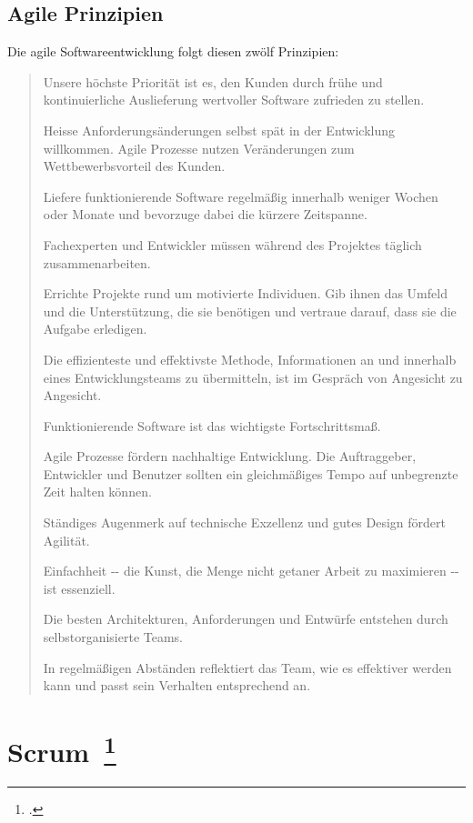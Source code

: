 \subsection{Agile Prinzipien}

Die agile Softwareentwicklung folgt diesen zwölf Prinzipien:

\begin{quote}Unsere höchste Priorität ist es, den Kunden durch frühe und kontinuierliche Auslieferung wertvoller Software zufrieden zu stellen.

Heisse Anforderungsänderungen selbst spät in der Entwicklung willkommen. Agile Prozesse nutzen Veränderungen zum Wettbewerbsvorteil des Kunden.

Liefere funktionierende Software regelmäßig innerhalb weniger Wochen oder Monate und bevorzuge dabei die kürzere Zeitspanne.

Fachexperten und Entwickler müssen während des Projektes täglich zusammenarbeiten.

Errichte Projekte rund um motivierte Individuen. Gib ihnen das Umfeld und die Unterstützung, die sie benötigen und vertraue darauf, dass sie die Aufgabe erledigen.

Die effizienteste und effektivste Methode, Informationen an und innerhalb eines Entwicklungsteams zu übermitteln, ist im Gespräch von Angesicht zu Angesicht.

Funktionierende Software ist das wichtigste Fortschrittsmaß.

Agile Prozesse fördern nachhaltige Entwicklung. Die Auftraggeber, Entwickler und Benutzer sollten ein gleichmäßiges Tempo auf unbegrenzte Zeit halten können.

Ständiges Augenmerk auf technische Exzellenz und gutes Design fördert Agilität.

Einfachheit -\phantom{}- die Kunst, die Menge nicht getaner Arbeit zu maximieren -\phantom{}- ist essenziell.

Die besten Architekturen, Anforderungen und Entwürfe entstehen durch selbstorganisierte Teams.

In regelmäßigen Abständen reflektiert das Team, wie es effektiver werden kann und passt sein Verhalten entsprechend an.\end{quote}\cite{agile_principles}

\newpage
\section[Scrum]{Scrum~\footcite[vgl.][S.13ff]{scrum_kurz_gut_2013}}\label{section:scrum}

